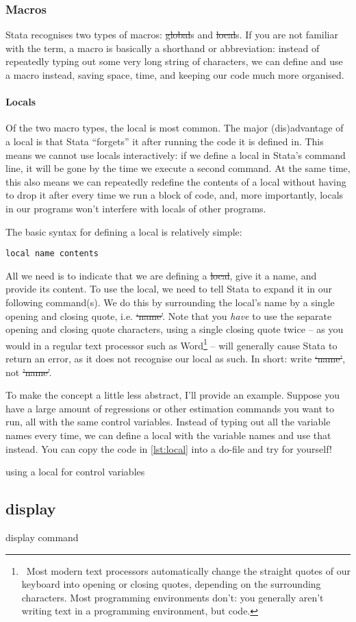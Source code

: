 \subsubsection{Macros}

Stata recognises two types of macros: \st{global}s and \st{local}s.
If you are not familiar with the term,
a macro is basically a shorthand or abbreviation:
instead of repeatedly typing out some very long string of characters,
we can define and use a macro instead, saving space, time,
and keeping our code much more organised.

\paragraph{Locals}
Of the two macro types, the local is most common.
The major (dis)advantage of a local is that Stata ``forgets'' it after running the code it is defined in.
This means we cannot use locals interactively:
if we define a local in Stata's command line,
it will be gone by the time we execute a second command.
At the same time,
this also means we can repeatedly redefine the contents of a local without having to drop it after every time we run a block of code,
and, more importantly, locals in our programs won't interfere with locals of other programs.

The basic syntax for defining a local is relatively simple:
\begin{verbatim}
local name contents
\end{verbatim}
All we need is to indicate that we are defining a \st{local}, give it a name,
and provide its content.
To use the local, we need to tell Stata to expand it in our following command(s).
We do this by surrounding the local's name by a single opening and closing quote, i.e. \st{`name'}.
Note that you \emph{have} to use the separate opening and closing quote characters,
using a single closing quote twice --
as you would in a regular text processor such as Word\footnote{%
~Most modern text processors automatically change the straight quotes of our keyboard into opening or closing quotes,
depending on the surrounding characters.
Most programming environments don't:
you generally aren't writing text in a programming environment, but code.} --
will generally cause Stata to return an error,
as it does not recognise our local as such.
In short: write \st{`name'}, not \st{'name'}.

To make the concept a little less abstract, I'll provide an example.
Suppose you have a large amount of regressions or other estimation commands you want to run,
all with the same control variables.
Instead of typing out all the variable names every time,
we can define a local with the variable names and use that instead.
You can copy the code in \cref{lst:local} into a do-file and try for yourself!

\begin{listing}[htp]
\caption{using a local for control variables}\label{lst:local}
\end{listing}
\subsection{display}

display command
